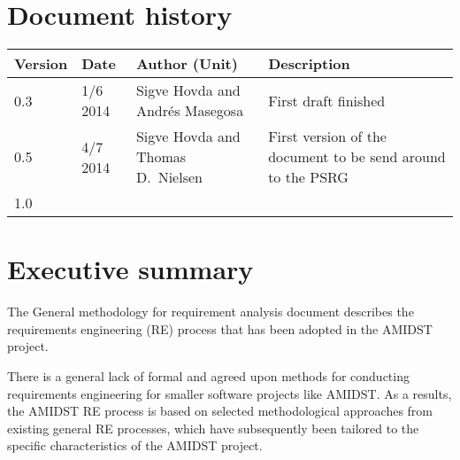\documentclass[11pt, oneside]{article}   	%
\begin{document}


%
%



\tableofcontents

\newpage


\section*{Document history}

\begin{table}[htbp]
  \centering
  \begin{tabularx}{\linewidth}{|p{15mm}|p{15mm}|X|X|}\hline
    {\bf Version} & {\bf Date} & {\bf Author (Unit)} & {\bf Description} \\ \hline \hline
    0.3 & 1/6 2014 & Sigve Hovda and Andr\'es Masegosa & First draft finished  \\ \hline
    0.5 & 4/7 2014 & Sigve Hovda and Thomas D.\ Nielsen& First version of the document to be send around to the PSRG  \\ \hline
    1.0 & & & \\ \hline \hline
  \end{tabularx}
\end{table}

\newpage



\section{Executive summary}

The General methodology for requirement analysis document describes the requirements engineering (RE) process that has
been adopted in the AMIDST project. 

There is a general lack of formal and agreed upon methods for conducting
requirements engineering for smaller software projects like AMIDST. As a results, the AMIDST RE process is based on selected methodological approaches from existing
general RE processes, which have subsequently been 
tailored to the specific characteristics of the AMIDST project. 
\end{document}
